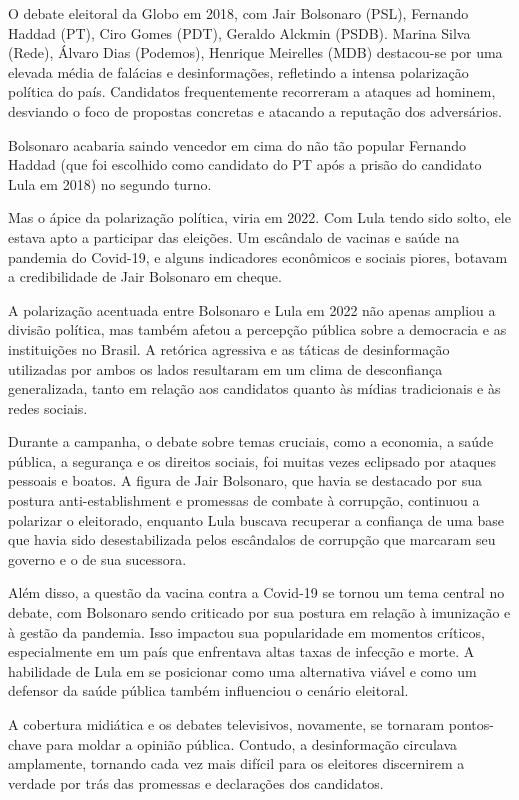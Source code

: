 \documentclass[12pt]{article}
\begin{document}
O debate eleitoral da Globo em 2018, com Jair Bolsonaro (PSL), Fernando Haddad (PT), Ciro Gomes (PDT), Geraldo Alckmin (PSDB). Marina Silva (Rede), Álvaro Dias (Podemos), Henrique Meirelles (MDB) destacou-se por uma elevada média de falácias e desinformações, refletindo a intensa polarização política do país. Candidatos frequentemente recorreram a ataques ad hominem, desviando o foco de propostas concretas e atacando a reputação dos adversários.

Bolsonaro acabaria saindo vencedor em cima do não tão popular Fernando Haddad (que foi escolhido como candidato do PT após a prisão do candidato Lula em 2018) no segundo turno. 

Mas o ápice da polarização política, viria em 2022. Com Lula tendo sido solto, ele estava apto a participar das eleições. Um escândalo de vacinas e saúde na pandemia do Covid-19, e alguns indicadores econômicos e sociais piores, botavam a credibilidade de Jair Bolsonaro em cheque.

A polarização acentuada entre Bolsonaro e Lula em 2022 não apenas ampliou a divisão política, mas também afetou a percepção pública sobre a democracia e as instituições no Brasil. A retórica agressiva e as táticas de desinformação utilizadas por ambos os lados resultaram em um clima de desconfiança generalizada, tanto em relação aos candidatos quanto às mídias tradicionais e às redes sociais.

Durante a campanha, o debate sobre temas cruciais, como a economia, a saúde pública, a segurança e os direitos sociais, foi muitas vezes eclipsado por ataques pessoais e boatos. A figura de Jair Bolsonaro, que havia se destacado por sua postura anti-establishment e promessas de combate à corrupção, continuou a polarizar o eleitorado, enquanto Lula buscava recuperar a confiança de uma base que havia sido desestabilizada pelos escândalos de corrupção que marcaram seu governo e o de sua sucessora.

Além disso, a questão da vacina contra a Covid-19 se tornou um tema central no debate, com Bolsonaro sendo criticado por sua postura em relação à imunização e à gestão da pandemia. Isso impactou sua popularidade em momentos críticos, especialmente em um país que enfrentava altas taxas de infecção e morte. A habilidade de Lula em se posicionar como uma alternativa viável e como um defensor da saúde pública também influenciou o cenário eleitoral.

A cobertura midiática e os debates televisivos, novamente, se tornaram pontos-chave para moldar a opinião pública. Contudo, a desinformação circulava amplamente, tornando cada vez mais difícil para os eleitores discernirem a verdade por trás das promessas e declarações dos candidatos.
\end{document}
